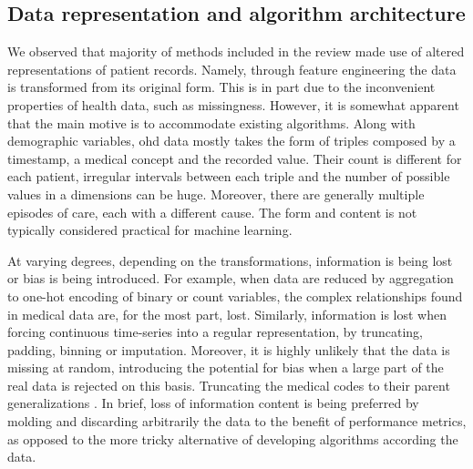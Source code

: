 \subsection{Data representation and algorithm architecture}
We observed that majority of methods included in the review made use of  altered representations of patient records. Namely, through feature engineering the data is transformed from its original form. This is in part due to the inconvenient properties of health data, such as missingness. However, it is somewhat apparent that the main motive is to accommodate existing algorithms. Along with demographic variables, \gls{ohd} data mostly takes the form of triples composed by a timestamp, a medical concept and the recorded value. Their count is different for each patient, irregular intervals between each triple and the number of possible values in a dimensions can be huge. Moreover, there are generally multiple episodes of care, each with a different cause. The form and content is not typically considered practical for machine learning. \par
At varying degrees, depending on the transformations, information is being lost or bias is being  introduced. For example, when data are reduced by aggregation to one-hot encoding of binary or count variables, the complex relationships found in medical data are, for the most part, lost. Similarly, information is lost when forcing continuous time-series into a regular representation, by truncating, padding, binning or imputation. Moreover, it is highly unlikely that the data is missing at random, introducing the potential for bias when a large part of the real data is rejected on this basis. Truncating the medical codes to their parent generalizations \cite{Zhang2020, Choi2017-nt}.  In brief, loss of information content is being preferred by molding and discarding arbitrarily the data to the benefit of performance metrics, as opposed to the more tricky alternative of developing algorithms according the data.\par

